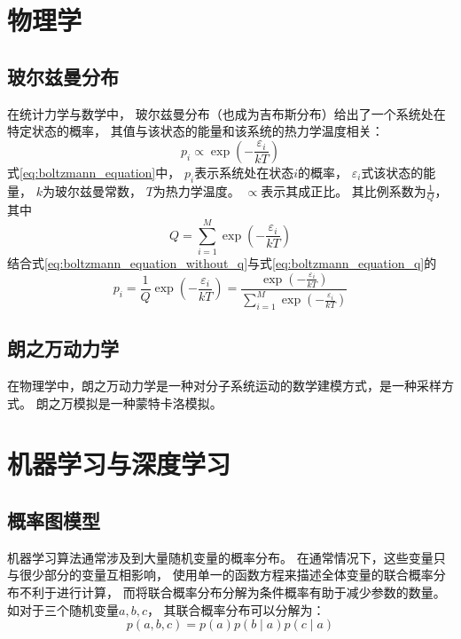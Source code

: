 \section{物理学}
\subsection{玻尔兹曼分布}
在统计力学与数学中，
玻尔兹曼分布（也成为吉布斯分布）给出了一个系统处在特定状态的概率，
其值与该状态的能量和该系统的热力学温度相关：
\begin{equation}
    \label{eq:boltzmann_equation_without_q}
    p_i \varpropto  \exp(-\frac{\varepsilon_i}{kT})
\end{equation}
式{\ref{eq:boltzmann_equation}}中，
{$p_i$}表示系统处在状态{$i$}的概率，
{$\varepsilon _i$}式该状态的能量，
{$k$}为玻尔兹曼常数，
{$T$}为热力学温度。
{$\varpropto$}表示其成正比。
其比例系数为{$\frac{1}{Q}$}，其中
\begin{equation}
    \label{eq:boltzmann_equation_q}
    Q=\sum_{i=1}^{M} \exp(-\frac{\varepsilon_i}{kT})
\end{equation}
结合式{\ref{eq:boltzmann_equation_without_q}}与式{\ref{eq:boltzmann_equation_q}}的
\begin{equation}
    \label{eq:boltzmann_equation}
    p_i = \frac{1}{Q} \exp(-\frac{\varepsilon_i}{kT})
    =\frac{\exp(-\frac{\varepsilon_i}{kT})}{\sum_{i=1}^{M} \exp(-\frac{\varepsilon_i}{kT})}
\end{equation}






\subsection{朗之万动力学}

在物理学中，朗之万动力学是一种对分子系统运动的数学建模方式，是一种采样方式。
朗之万模拟是一种蒙特卡洛模拟。



\section{机器学习与深度学习}
\subsection{概率图模型}

机器学习算法通常涉及到大量随机变量的概率分布。
在通常情况下，这些变量只与很少部分的变量互相影响，
使用单一的函数方程来描述全体变量的联合概率分布不利于进行计算，
而将联合概率分布分解为条件概率有助于减少参数的数量。
如对于三个随机变量{$a,b,c$}，
其联合概率分布可以分解为：
\begin{equation}
    p(a,b,c)=p(a)p(b\mid a) p(c \mid a)
\end{equation}

